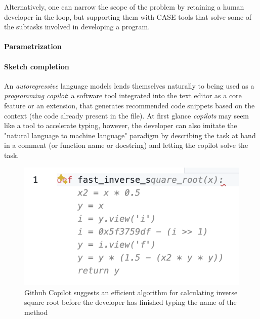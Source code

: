 Alternatively, one can narrow the scope of the problem by retaining a human developer in the loop, but supporting them with CASE \cite{caseComputeraidedSoftwareEngineering1985} tools that solve some of the subtasks involved in developing a program.

\paragraph{Parametrization}



\paragraph{Sketch completion}


An \emph{autoregressive} language models lends themselves naturally to being used as a \emph{programming copilot}: a software tool integrated into the text editor as a core feature or an extension, that generates recommended code snippets based on the context (the code already present in the file).
At first glance \emph{copilots} may seem like a tool to accelerate typing, however, the developer can also imitate the "natural language to machine language" paradigm by describing the task at hand in a comment (or function name or docstring) and letting the copilot solve the task.


\begin{figure}[H]
    \centering
    \includegraphics{images/fastinversesqrt.png}
    \caption{Github Copilot \cite{dakhelGithubCopilotAi2023, nguyenEmpiricalEvaluationGitHub2022, wermelingerUsingGithubCopilot2023} suggests an efficient algorithm for calculating inverse square root \cite{lomontFastInverseSquare2003} before the developer has finished typing the name of the method}
    \label{fig:fastinversesqrt}
\end{figure}


